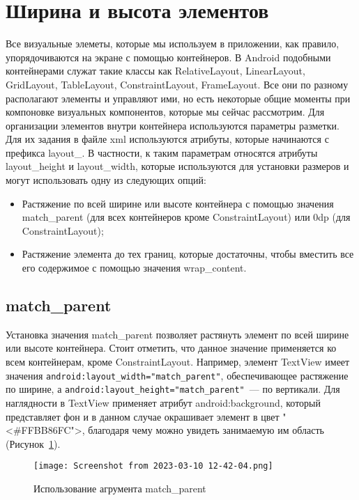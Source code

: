 \section{Ширина и высота элементов}
Все визуальные элеметы, которые мы используем в приложении, как
правило, упорядочиваются на экране с помощью контейнеров. В Android
подобными контейнерами служат такие классы как RelativeLayout,
LinearLayout, GridLayout, TableLayout, ConstraintLayout, FrameLayout. Все
они по разному располагают элементы и управляют ими, но есть некоторые
общие моменты при компоновке визуальных компонентов, которые мы
сейчас рассмотрим.
Для организации элементов внутри контейнера используются параметры
разметки. Для их задания в файле xml используются атрибуты, которые
начинаются с префикса layout\_. В частности, к таким параметрам относятся
атрибуты layout\_height и layout\_width, которые используются для установки
размеров и могут использовать одну из следующих опций:
\begin{itemize}
	\item Растяжение по всей ширине или высоте контейнера с помощью значения
		match\_parent (для всех контейнеров кроме ConstraintLayout)
		или 0dp (для ConstraintLayout);
	\item Растяжение элемента до тех границ, которые достаточны,
		чтобы вместить все его содержимое с помощью значения wrap\_content.
\end{itemize}

\subsection{match\_parent}
Установка значения match\_parent позволяет растянуть элемент по всей
ширине или высоте контейнера. Стоит отметить, что данное значение
применяется ко всем контейнерам, кроме ConstraintLayout. Например,
элемент TextView имеет значения
\texttt{android:layout\_width="match\_parent"}, обеспечивающее растяжение
по ширине, а \texttt{android:layout\_height="match\_parent"}~--- по вертикали.
Для наглядности в TextView применяет атрибут android:background,
который представляет фон и в данном случае окрашивает элемент
в цвет "<\#FFBB86FC">, благодаря чему можно увидеть занимаемую им область
(Рисунок~\ref{fig:xm:set_hw}).

\begin{figure}[h!tp]
	\centering
	\texttt{[image: Screenshot from 2023-03-10 12-42-04.png]}
	\caption{Использование агрумента match\_parent}
	\label{fig:xm:set_hw}
\end{figure}

